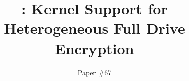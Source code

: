 
\def \mytitle {\sys: Kernel Support for Heterogeneous Full Drive Encryption}


\title{\textsf{\mytitle}}

\author{Paper \#67}

\date{}

\maketitle
